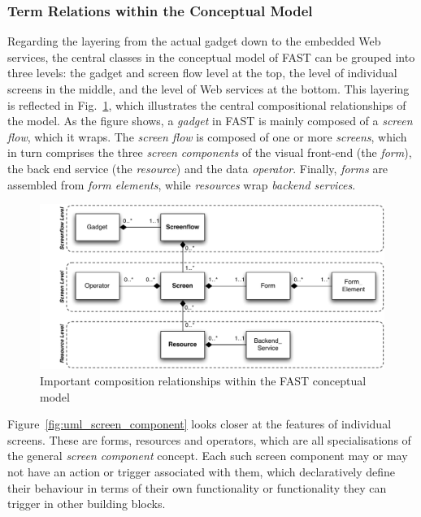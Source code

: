 \documentclass{article}
\begin{document}
\subsubsection{Term Relations within the Conceptual Model} %
\label{ssub:term_relations_within_the_conceptual_model}

Regarding the layering from the actual gadget down to the embedded Web services, the central classes in the conceptual model of FAST can be grouped into three levels: the gadget and screen flow level at the top, the level of individual screens in the middle, and the level of Web services at the bottom. This layering is reflected in Fig.~\ref{fig:uml_composition}, which illustrates the central compositional relationships of the model. As the figure shows, a \emph{gadget} in FAST is mainly composed of a \emph{screen flow}, which it wraps. The \emph{screen flow} is composed of one or more \emph{screens}, which in turn comprises the three \emph{screen components} of the visual front-end (the \emph{form}), the back end service (the \emph{resource}) and the data \emph{operator}. Finally, \emph{forms} are assembled from \emph{form elements}, while \emph{resources} wrap \emph{backend services}.


\begin{figure}
  \begin{center}
    \includegraphics[scale=.66]{images/uml_composition.pdf}
    \caption{Important composition relationships within the FAST conceptual model}
    \label{fig:uml_composition}
  \end{center}
\end{figure}

Figure~\ref{fig:uml_screen_component} looks closer at the features of individual screens. These are forms, resources and operators, which are all specialisations of the general \emph{screen component} concept. Each such screen component may or may not have an action or trigger associated with them, which declaratively define their behaviour in terms of their own functionality or functionality they can trigger in other building blocks.
\end{document}
